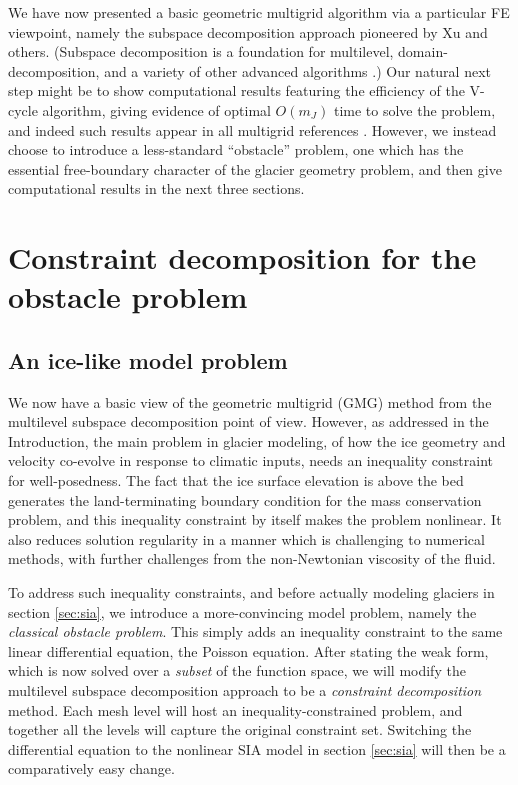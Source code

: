 \documentclass[letterpaper,final,12pt,reqno]{amsart}
\theoremstyle{claim}
\numberwithin{equation}{section}
\numberwithin{figure}{section}
\numberwithin{table}{section}
\begin{document}
We have now presented a basic geometric multigrid algorithm via a particular FE viewpoint, namely the subspace decomposition approach pioneered by Xu \cite{Xu1992} and others.  (Subspace decomposition is a foundation for multilevel, domain-decomposition, and a variety of other advanced algorithms \cite{Farrelletal2019}.)  Our natural next step might be to show computational results featuring the efficiency of the V-cycle algorithm, giving evidence of optimal $O(m_J)$ time to solve the problem, and indeed such results appear in all multigrid references \cite{Briggsetal2000,Bueler2021,Elmanetal2014,Trottenbergetal2001}.  However, we instead choose to introduce a less-standard ``obstacle'' problem, one which has the essential free-boundary character of the glacier geometry problem, and then give computational results in the next three sections.


\section{Constraint decomposition for the obstacle problem} \label{sec:obstacle}

\subsection*{An ice-like model problem}  We now have a basic view of the geometric multigrid (GMG) method from the multilevel subspace decomposition point of view.  However, as addressed in the Introduction, the main problem in glacier modeling, of how the ice geometry and velocity co-evolve in response to climatic inputs, needs an inequality constraint for well-posedness.  The fact that the ice surface elevation is above the bed generates the land-terminating boundary condition for the mass conservation problem, and this inequality constraint by itself makes the problem nonlinear.  It also reduces solution regularity in a manner which is challenging to numerical methods, with further challenges from the non-Newtonian viscosity of the fluid.

To address such inequality constraints, and before actually modeling glaciers in section \ref{sec:sia}, we introduce a more-convincing model problem, namely the \emph{classical obstacle problem}.  This simply adds an inequality constraint to the same linear differential equation, the Poisson equation.  After stating the weak form, which is now solved over a \emph{subset} of the function space, we will modify the multilevel subspace decomposition approach to be a \emph{constraint decomposition} method.  Each mesh level will host an inequality-constrained problem, and together all the levels will capture the original constraint set.  Switching the differential equation to the nonlinear SIA model in section \ref{sec:sia} will then be a comparatively easy change.
\end{document}
